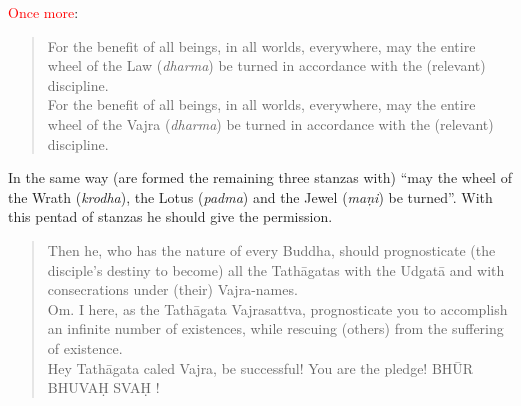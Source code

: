 \documentclass[11pt]{book}
\makeatletter
\def\fakesc#1{%
  \begingroup%
  \xdef\fake@name{\csname\curr@fontshape/\f@size\endcsname}%
  \fontsize{1.3\fontdimen8\fake@name}{\baselineskip}\selectfont%
  \uppercase{#1}%
  \endgroup%
}
\newcommand{\mantra}[1]{\fakesc{#1}}
\newcommand{\red}[1]{\textcolor{red}{#1}}
\newcommand{\skt}[1]{\emph{#1}}
\makeatother
\begin{document}

\red{Once more}:

\begin{verse}
For the benefit of all beings, in all worlds, everywhere, may the entire wheel of the Law (\skt{dharma}) be turned in accordance with the (relevant) discipline.\\
For the benefit of all beings, in all worlds, everywhere, may the entire wheel of the Vajra (\skt{dharma}) be turned in accordance with the (relevant) discipline.
\end{verse}

In the same way (are formed the remaining three stanzas with) ``may the wheel of the Wrath (\skt{krodha}), the Lotus (\skt{padma}) and the Jewel (\skt{maṇi}) be turned''. With this pentad of stanzas he should give the permission.


\begin{verse}
Then he, who has the nature of every Buddha, should prognosticate (the disciple's destiny to become) all the Tathāgatas with the Udgatā and with consecrations under (their) Vajra-names.\\
Om. I here, as the Tathāgata Vajrasattva, prognosticate you to accomplish an infinite number of existences, while rescuing (others) from the suffering of existence.\\
Hey Tathāgata caled Vajra, be successful! You are the pledge! \mantra{bhūr bhuvaḥ svaḥ}!
\end{verse}
\end{document}

